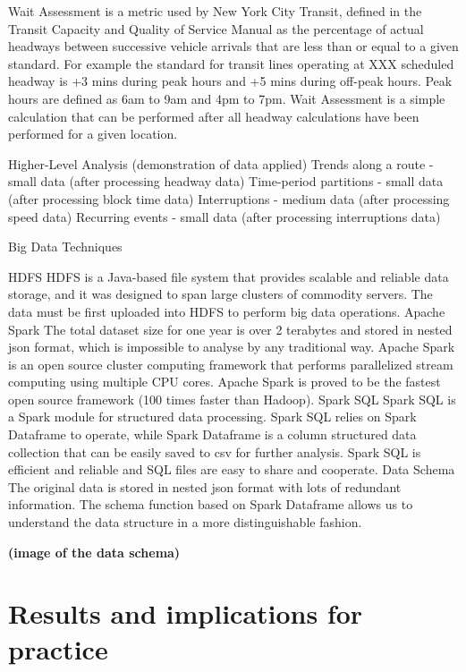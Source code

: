 \documentclass[12pt]{report}
\begin{document}
Wait Assessment is a metric used by New York City Transit, defined in the Transit Capacity and Quality of Service Manual as the percentage of actual headways between successive vehicle arrivals that are less than or equal to a given standard.  For example the standard for transit lines operating at XXX scheduled headway is +3 mins during peak hours and +5 mins during off-peak hours.  Peak hours are defined as 6am to 9am and 4pm to 7pm.  Wait Assessment is a simple calculation that can be performed after all headway calculations have been performed for a given location.


Higher-Level Analysis (demonstration of data applied)
Trends along a route - small data (after processing headway data)
Time-period partitions - small data (after processing block time data)
Interruptions - medium data (after processing speed data)
Recurring events - small data (after processing interruptions data)

Big Data Techniques

HDFS
HDFS is a Java-based file system that provides scalable and reliable data storage, and it was designed to span large clusters of commodity servers.
The data must be first uploaded into HDFS to perform big data operations.
Apache Spark 
The total dataset size for one year is over 2 terabytes and stored in nested json format, which is impossible to analyse by any traditional way.
Apache Spark is an open source cluster computing framework that performs parallelized stream computing using multiple CPU cores. Apache Spark is proved to be the fastest open source framework (100 times faster than Hadoop).
Spark SQL
Spark SQL is a Spark module for structured data processing.  Spark SQL relies on Spark Dataframe to operate, while Spark Dataframe is a column structured data collection that can be easily saved to csv for further analysis. 
Spark SQL is efficient and reliable and SQL files are easy to share and cooperate.
Data Schema
The original data is stored in nested json format with lots of redundant information.
The schema function based on Spark Dataframe allows us to understand the data structure in a more distinguishable fashion.


\textbf{(image of the data schema)}

\section{Results and implications for practice}
\end{document}

